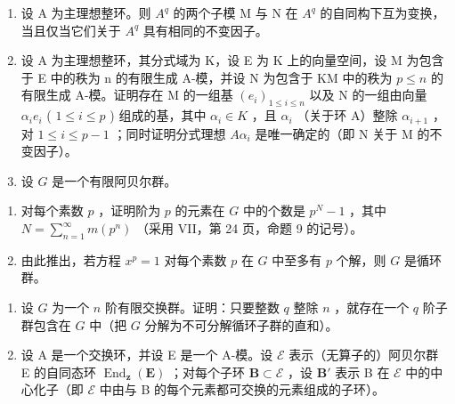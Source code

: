 \begin{enumerate}
\def\labelenumi{\arabic{enumi})}
\setcounter{enumi}{1}
\item
  设 A 为主理想整环。则 \(A^{q}\) 的两个子模 M 与 N 在 \(A^{q}\) 的自同构下互为变换，当且仅当它们关于 \(A^{q}\) 具有相同的不变因子。
\item
  设 A 为主理想整环，其分式域为 K，设 E 为 K 上的向量空间，设 M 为包含于 E 中的秩为 n 的有限生成 A-模，并设 N 为包含于 KM 中的秩为 \(p \leqslant n\) 的有限生成 A-模。证明存在 M 的一组基 \((e_{i})_{1 \leqslant i \leqslant n}\) 以及 N 的一组由向量 \(\alpha_{i}e_{i}\) ( \(1 \leqslant i \leqslant p\) ) 组成的基，其中 \(\alpha_{i} \in K\) ，且 \(\alpha_{i}\) （关于环 A）整除 \(\alpha_{i+1}\) ，对 \(1 \leqslant i \leqslant p - 1\) ；同时证明分式理想 \(A\alpha_{i}\) 是唯一确定的（即 N 关于 M 的不变因子）。
\item
  设 \(G\) 是一个有限阿贝尔群。
\end{enumerate}

\begin{enumerate}
\def\labelenumi{\alph{enumi})}
\item
  对每个素数 \(p\) ，证明阶为 \(p\) 的元素在 \(G\) 中的个数是 \(p^N - 1\) ，其中 \(N = \sum_{n=1}^{\infty} m(p^n)\) （采用 VII，第 24 页，命题 9 的记号）。
\item
  由此推出，若方程 \(x^p = 1\) 对每个素数 \(p\) 在 \(G\) 中至多有 \(p\) 个解，则 \(G\) 是循环群。
\end{enumerate}

\begin{enumerate}
\def\labelenumi{\arabic{enumi})}
\setcounter{enumi}{4}
\item
  设 \(G\) 为一个 \(n\) 阶有限交换群。证明：只要整数 \(q\) 整除 \(n\) ，就存在一个 \(q\) 阶子群包含在 \(G\) 中（把 \(G\) 分解为不可分解循环子群的直和）。
\item
  设 A 是一个交换环，并设 E 是一个 A-模。设 \(\mathcal{E}\) 表示（无算子的）阿贝尔群 E 的自同态环 \(\operatorname{End}_{\mathbf{z}}(\mathbf{E})\) ；对每个子环 \(\mathbf{B} \subset \mathcal{E}\) ，设 \(\mathbf{B}'\) 表示 B 在 \(\mathcal{E}\) 中的中心化子（即 \(\mathcal{E}\) 中由与 B 的每个元素都可交换的元素组成的子环）。
\end{enumerate}

